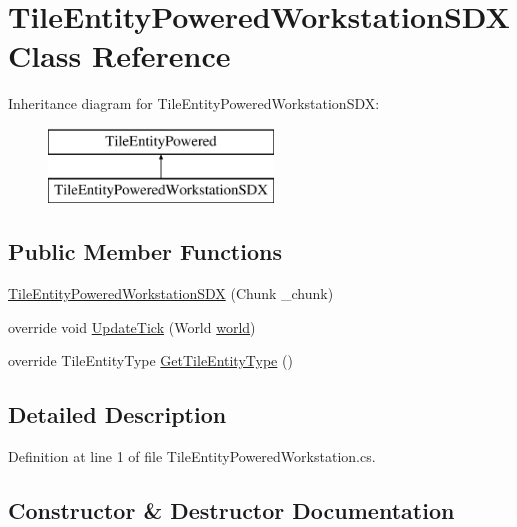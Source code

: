 \hypertarget{class_tile_entity_powered_workstation_s_d_x}{}\section{Tile\+Entity\+Powered\+Workstation\+S\+DX Class Reference}
\label{class_tile_entity_powered_workstation_s_d_x}
Inheritance diagram for Tile\+Entity\+Powered\+Workstation\+S\+DX\+:\begin{figure}[H]
\begin{center}
\leavevmode
\includegraphics[height=2.000000cm]{d1/d1b/class_tile_entity_powered_workstation_s_d_x}
\end{center}
\end{figure}
\subsection*{Public Member Functions}
\begin{DoxyCompactItemize}
\item 
\mbox{\hyperlink{class_tile_entity_powered_workstation_s_d_x_a292fe991ecfb4aa5b17568dbe2fa9d54}{Tile\+Entity\+Powered\+Workstation\+S\+DX}} (Chunk \+\_\+chunk)
\item 
override void \mbox{\hyperlink{class_tile_entity_powered_workstation_s_d_x_a7bdf58d110502b7e49b3fa83d566b40e}{Update\+Tick}} (World \mbox{\hyperlink{_sphere_i_i_01_music_01_boxes_2_config_2_localization_8txt_a7ede01351426b1b7f6c1ce5f794e474f}{world}})
\item 
override Tile\+Entity\+Type \mbox{\hyperlink{class_tile_entity_powered_workstation_s_d_x_a061cabab272b38180da470223feeeb5d}{Get\+Tile\+Entity\+Type}} ()
\end{DoxyCompactItemize}


\subsection{Detailed Description}


Definition at line 1 of file Tile\+Entity\+Powered\+Workstation.\+cs.



\subsection{Constructor \& Destructor Documentation}
\mbox{\label{class_tile_entity_powered_workstation_s_d_x_a292fe991ecfb4aa5b17568dbe2fa9d54}} 

